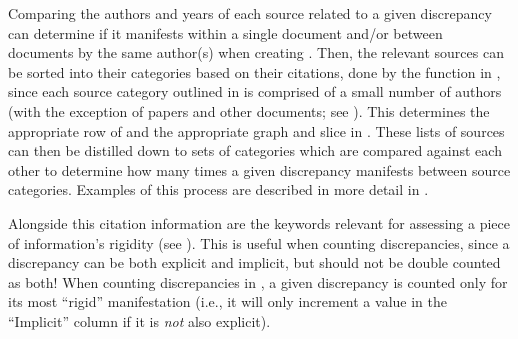 Comparing the authors and years of each source related to a given discrepancy
can determine if it manifests within a single document and/or between documents
by the same author(s) when creating . Then, the
relevant sources can be sorted into their categories based on their citations,
done by the function in , since each source category
outlined in  is comprised of a small number of authors (with the
exception of papers and other documents; see ). This determines
the appropriate row of  and the appropriate
graph and slice in . These lists of sources can then
be distilled down to sets of categories which are compared against
each other to determine how many times a given discrepancy manifests between
source categories. Examples of this process are described in more detail in
.

\label{auto-discrep-analysis-rigidity}
Alongside this citation information are the keywords relevant for assessing a
piece of information's rigidity (see ). This is useful when
counting discrepancies, since a discrepancy can be both explicit and implicit,
but should not be double counted as both! When counting
discrepancies in , a given discrepancy is
counted only for its most ``rigid'' manifestation (i.e., it will only increment
a value in the ``Implicit'' column if it is \emph{not} also explicit).

